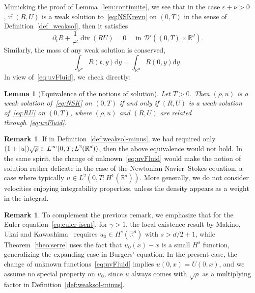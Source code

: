 \documentclass[10pt]{amsart}
\newtheorem{lemm}[theo]{Lemma}\newtheorem{prop}[theo]{Proposition}\newtheorem{coro}[theo]{Corollary}\newtheorem{conj}[theo]{Conjecture}
\theoremstyle{definition}\newtheorem{defi}[theo]{Definition}\newtheorem{rema}[theo]{Remark}\newtheorem{exam}[theo]{Example}\newtheorem{exem}[theo]{Example}\newtheorem{nota}[theo]{Notation}
\DeclareMathOperator{\DIV}{div}
\newcommand*\R{\mathbb{R}}
\newcommand*\dd {\mathrm{d}}
\newcommand*\<{\left\langle}
\renewcommand*\>{\right\rangle}
\newcommand*\eps{\varepsilon}
\begin{document}
Mimicking the proof of Lemma~\ref{lem:continuite}, we see that in the case $\eps + \nu >0$, if $(R,U)$ is a weak solution to~\eqref{eq:NSKrevu} on $(0,T)$ in the sense of Definition~\ref{def_weaksol}, then it satisfies
\[
\partial_t R +\frac{1}{\tau^2} \DIV(R U) = 0 \quad \text{ in \ $\mathcal D'((0,T) \times \mathbb R^d).$}
\]
Similarly, the mass of any weak solution is conserved,
\begin{equation*}
\int_{\R^d} R(t,y)\dd y = \int_{\R^d} R(0,y)\dd y.
\end{equation*}
In view of~\eqref{eq:uvFluid}, we check directly:

\begin{lemm}[Equivalence of the notions of solution]\label{lem:equivalence}
Let $T>0$. Then $(\rho,u)$ is a weak solution of~\eqref{eq:NSK} on $(0,T)$ if and only if $(R,U)$ is a weak solution of~\eqref{eq:RU} on $(0,T)$, where $(\rho,u)$ and $(R,U)$ are related through~\eqref{eq:uvFluid}.
\end{lemm}

\begin{rema}
If in Definition~\ref{def:weaksol-minus}, we had required only $(1+|u|)\sqrt\rho\in\linebreak L^\infty(0,T; L^2(\R^d))$, then the above equivalence would not hold. In the same spirit, the change of unknown~\eqref{eq:uvFluid} would make the notion of solution rather delicate in the case of the Newtonian Navier--Stokes equation, a case where typically $u\in L^2(0,T; H^1(\R^d))$. More generally, we do not consider velocities enjoying integrability properties, unless the density appears as a weight in the integral.
\end{rema}

\begin{rema}
To complement the previous remark, we emphasize that for the Euler equation~\eqref{eq:euler-isent}, for $\gamma>1$, the local existence result by Makino, Ukai and Kawashima~\cite{MUK86} requires $u_0\in H^s(\R^d)$ with $s>d/2+1$, while Theorem~\ref{theo:serre} uses the fact that $u_0(x)-x$ is a small $H^s$ function, generalizing the expanding case in Burgers' equation. In the present case, the change of unknown functions~\eqref{eq:uvFluid} implies $u(0,x)=U(0,x)$, and we assume no special property on $u_0$, since $u$ always comes with $\sqrt{\rho}$ as a multiplying factor in Definition~\ref{def:weaksol-minus}.
\end{rema}
\end{document}
